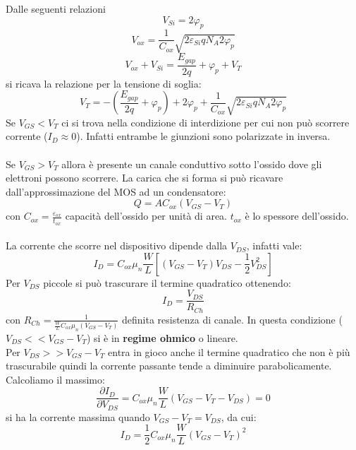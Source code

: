 \documentclass{article}
\begin{document}
Dalle seguenti relazioni
\begin{equation*}
V_{Si} = 2\varphi_p
\end{equation*}
\begin{equation*}
V_{ox} = \frac{1}{C_{ox}} \sqrt{2\varepsilon_{Si} q N_A 2\varphi_p}
\end{equation*}
\begin{equation*}
V_{ox} + V_{Si} = \frac{E_{gap}}{2q} + \varphi_p + V_T
\end{equation*}
si ricava la relazione per la tensione di soglia:
\begin{equation*}
V_T = -\left( \frac{E_{gap}}{2q} + \varphi_p \right) + 2\varphi_p + \frac{1}{C_{ox}}\sqrt{2\varepsilon_{Si} q N_A 2\varphi_p}
\end{equation*}
Se $V_{GS} < V_T$ ci si trova nella condizione di interdizione per cui non può scorrere corrente ($I_D \approx 0$). Infatti entrambe le giunzioni sono polarizzate in inversa.\\
\\
Se $V_{GS} > V_T$ allora è presente un canale conduttivo sotto l'ossido dove gli elettroni possono scorrere. La carica che si forma si può ricavare dall'approssimazione del MOS ad un condensatore:
\begin{equation*}
Q = A C_{ox} (V_{GS} - V_T)
\end{equation*}
con $C_{ox} = \frac{\varepsilon_{ox}}{t_{ox}}$ capacità dell'ossido per unità di area. $t_{ox}$ è lo spessore dell'ossido.\\
\\
La corrente che scorre nel dispositivo dipende dalla $V_{DS}$, infatti vale:
\begin{equation}\label{eq:corrente_ch}
I_D = C_{ox} \mu_n \frac{W}{L} \left[ (V_{GS} - V_T)V_{DS} - \frac{1}{2}V_{DS}^2 \right]
\end{equation}
Per $V_{DS}$ piccole si può trascurare il termine quadratico ottenendo:
\begin{equation*}
I_D = \frac{V_{DS}}{R_{Ch}}
\end{equation*}
con $R_{Ch} = \frac{1}{\frac{W}{L} C_{ox} \mu_n (V_{GS} - V_T)}$  definita resistenza di canale. In questa condizione ($V_{DS} << V_{GS} - V_T$) si è in \textbf{regime ohmico} o lineare.\\
Per $V_{DS} >> V_{GS} - V_T$ entra in gioco anche il termine quadratico che non è più trascurabile quindi la corrente passante tende a diminuire parabolicamente. Calcoliamo il massimo:
\begin{equation*}
\frac{\partial I_D}{ \partial V_{DS}} = C_{ox} \mu_n \frac{W}{L} (V_{GS} - V_T - V_{DS}) = 0
\end{equation*}
si ha la corrente massima quando $V_{GS} - V_T = V_{DS}$, da cui:
\begin{equation}	\label{eq:corrente_sat}
I_D = \frac{1}{2} C_{ox} \mu_n \frac{W}{L} (V_{GS} - V_T)^2
\end{equation}
\end{document}
